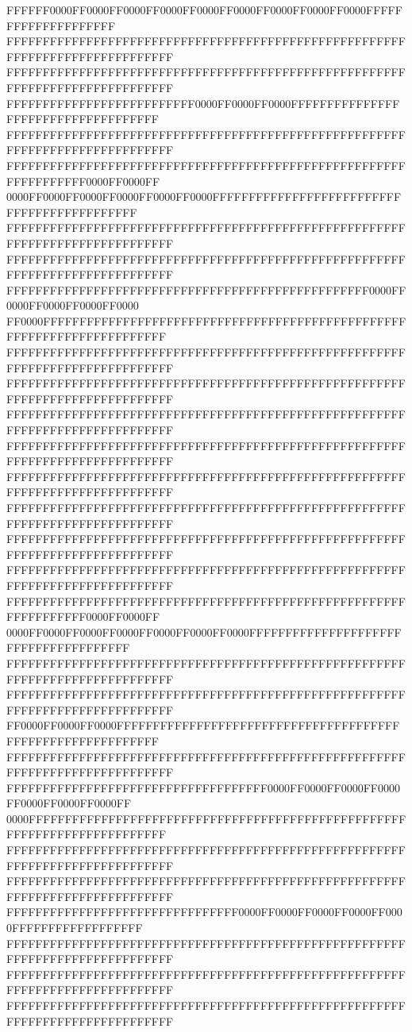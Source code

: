 FFFFFF0000FF0000FF0000FF0000FF0000FF0000FF0000FF0000FF0000FFFFFFFFFFFFFFFFFFFF
FFFFFFFFFFFFFFFFFFFFFFFFFFFFFFFFFFFFFFFFFFFFFFFFFFFFFFFFFFFFFFFFFFFFFFFFFFFFFF
FFFFFFFFFFFFFFFFFFFFFFFFFFFFFFFFFFFFFFFFFFFFFFFFFFFFFFFFFFFFFFFFFFFFFFFFFFFFFF
FFFFFFFFFFFFFFFFFFFFFFFFFF0000FF0000FF0000FFFFFFFFFFFFFFFFFFFFFFFFFFFFFFFFFFFF
FFFFFFFFFFFFFFFFFFFFFFFFFFFFFFFFFFFFFFFFFFFFFFFFFFFFFFFFFFFFFFFFFFFFFFFFFFFFFF
FFFFFFFFFFFFFFFFFFFFFFFFFFFFFFFFFFFFFFFFFFFFFFFFFFFFFFFFFFFFFFFFFF0000FF0000FF
0000FF0000FF0000FF0000FF0000FF0000FFFFFFFFFFFFFFFFFFFFFFFFFFFFFFFFFFFFFFFFFFFF
FFFFFFFFFFFFFFFFFFFFFFFFFFFFFFFFFFFFFFFFFFFFFFFFFFFFFFFFFFFFFFFFFFFFFFFFFFFFFF
FFFFFFFFFFFFFFFFFFFFFFFFFFFFFFFFFFFFFFFFFFFFFFFFFFFFFFFFFFFFFFFFFFFFFFFFFFFFFF
FFFFFFFFFFFFFFFFFFFFFFFFFFFFFFFFFFFFFFFFFFFFFFFFFF0000FF0000FF0000FF0000FF0000
FF0000FFFFFFFFFFFFFFFFFFFFFFFFFFFFFFFFFFFFFFFFFFFFFFFFFFFFFFFFFFFFFFFFFFFFFFFF
FFFFFFFFFFFFFFFFFFFFFFFFFFFFFFFFFFFFFFFFFFFFFFFFFFFFFFFFFFFFFFFFFFFFFFFFFFFFFF
FFFFFFFFFFFFFFFFFFFFFFFFFFFFFFFFFFFFFFFFFFFFFFFFFFFFFFFFFFFFFFFFFFFFFFFFFFFFFF
FFFFFFFFFFFFFFFFFFFFFFFFFFFFFFFFFFFFFFFFFFFFFFFFFFFFFFFFFFFFFFFFFFFFFFFFFFFFFF
FFFFFFFFFFFFFFFFFFFFFFFFFFFFFFFFFFFFFFFFFFFFFFFFFFFFFFFFFFFFFFFFFFFFFFFFFFFFFF
FFFFFFFFFFFFFFFFFFFFFFFFFFFFFFFFFFFFFFFFFFFFFFFFFFFFFFFFFFFFFFFFFFFFFFFFFFFFFF
FFFFFFFFFFFFFFFFFFFFFFFFFFFFFFFFFFFFFFFFFFFFFFFFFFFFFFFFFFFFFFFFFFFFFFFFFFFFFF
FFFFFFFFFFFFFFFFFFFFFFFFFFFFFFFFFFFFFFFFFFFFFFFFFFFFFFFFFFFFFFFFFFFFFFFFFFFFFF
FFFFFFFFFFFFFFFFFFFFFFFFFFFFFFFFFFFFFFFFFFFFFFFFFFFFFFFFFFFFFFFFFFFFFFFFFFFFFF
FFFFFFFFFFFFFFFFFFFFFFFFFFFFFFFFFFFFFFFFFFFFFFFFFFFFFFFFFFFFFFFFFF0000FF0000FF
0000FF0000FF0000FF0000FF0000FF0000FF0000FFFFFFFFFFFFFFFFFFFFFFFFFFFFFFFFFFFFFF
FFFFFFFFFFFFFFFFFFFFFFFFFFFFFFFFFFFFFFFFFFFFFFFFFFFFFFFFFFFFFFFFFFFFFFFFFFFFFF
FFFFFFFFFFFFFFFFFFFFFFFFFFFFFFFFFFFFFFFFFFFFFFFFFFFFFFFFFFFFFFFFFFFFFFFFFFFFFF
FF0000FF0000FF0000FFFFFFFFFFFFFFFFFFFFFFFFFFFFFFFFFFFFFFFFFFFFFFFFFFFFFFFFFFFF
FFFFFFFFFFFFFFFFFFFFFFFFFFFFFFFFFFFFFFFFFFFFFFFFFFFFFFFFFFFFFFFFFFFFFFFFFFFFFF
FFFFFFFFFFFFFFFFFFFFFFFFFFFFFFFFFFFF0000FF0000FF0000FF0000FF0000FF0000FF0000FF
0000FFFFFFFFFFFFFFFFFFFFFFFFFFFFFFFFFFFFFFFFFFFFFFFFFFFFFFFFFFFFFFFFFFFFFFFFFF
FFFFFFFFFFFFFFFFFFFFFFFFFFFFFFFFFFFFFFFFFFFFFFFFFFFFFFFFFFFFFFFFFFFFFFFFFFFFFF
FFFFFFFFFFFFFFFFFFFFFFFFFFFFFFFFFFFFFFFFFFFFFFFFFFFFFFFFFFFFFFFFFFFFFFFFFFFFFF
FFFFFFFFFFFFFFFFFFFFFFFFFFFFFFFF0000FF0000FF0000FF0000FF0000FFFFFFFFFFFFFFFFFF
FFFFFFFFFFFFFFFFFFFFFFFFFFFFFFFFFFFFFFFFFFFFFFFFFFFFFFFFFFFFFFFFFFFFFFFFFFFFFF
FFFFFFFFFFFFFFFFFFFFFFFFFFFFFFFFFFFFFFFFFFFFFFFFFFFFFFFFFFFFFFFFFFFFFFFFFFFFFF
FFFFFFFFFFFFFFFFFFFFFFFFFFFFFFFFFFFFFFFFFFFFFFFFFFFFFFFFFFFFFFFFFFFFFFFFFFFFFF
